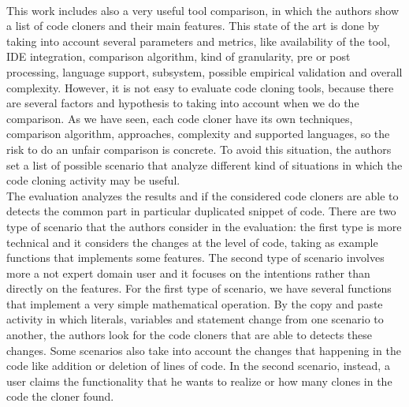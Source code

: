 \\
This work includes also a very useful tool comparison, in which the authors 
show a list of code cloners and their main features. This state of the art is 
done by taking into account several parameters and metrics, like availability 
of the tool, IDE integration, comparison algorithm, kind of granularity, pre or 
post processing, language support, subsystem, possible empirical validation and 
overall complexity. However, it is not easy to evaluate code cloning tools, 
because there are several factors and hypothesis to taking into account when we 
do the comparison. As we have seen, each code cloner have its own techniques, 
comparison algorithm, approaches, complexity and supported languages, so the 
risk to do an unfair comparison is concrete. To avoid this situation, the 
authors set a list of possible scenario that analyze different kind of 
situations in which the code cloning activity may be useful. \\
The evaluation analyzes the results and if the considered code cloners are able 
to detects the common part in particular duplicated snippet of code. There are 
two type of scenario that the authors consider in the evaluation: the first 
type is more technical and it considers the changes at the level of code, 
taking as example functions that implements some features. The second type of 
scenario involves more a not expert domain user and it focuses on the 
intentions rather than directly on the features. For the first type of 
scenario, we have several functions that implement a very simple mathematical 
operation. By the copy and paste activity in which literals, variables and 
statement change from one scenario to another, the authors look for the code 
cloners that are able to detects these changes. Some scenarios also take into 
account the changes that happening in the code like addition or deletion of 
lines of code. In the second scenario, instead, a user claims the functionality 
that he wants to realize or how many clones in the code the cloner found. 
\newline
